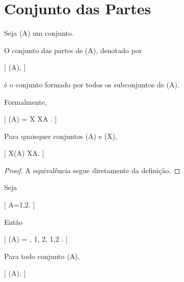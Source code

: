 \documentclass[../../main]{subfiles}
\begin{document}
\section{Conjunto das Partes}
\label{sec:matematica:teoria-conjuntos:conjunto-das-partes}

\begin{defn}
	\label{def:matematica:teoria-conjuntos:conjunto-das-partes:conjunto-das-partes}

	Seja (A) um conjunto.

	O conjunto das partes de (A), denotado por

		[
			(A),
		]

	é o conjunto formado por todos os subconjuntos de (A).

	Formalmente,

	[
			(A)
				=
				{
					X
					\mid
					X\subseteq A
				}.
		]

\end{defn}

\begin{prop}
	\label{prop:matematica:teoria-conjuntos:conjunto-das-partes:caracterizacao}

	Para quaisquer conjuntos (A) e (X),

	[
			X\in{}(A)
			\Leftrightarrow
			X\subseteq A.
		]

\end{prop}

\begin{proof}

	A equivalência segue diretamente da definição.

\end{proof}

\begin{ex}

	Seja

	[
	A={1,2}.
	]

	Então

	[
	(A)
		=
		{
			\varnothing,
			{1},
			{2},
			{1,2}
		}.
	]

\end{ex}

\begin{prop}
	\label{prop:matematica:teoria-conjuntos:conjunto-das-partes:vazio}

	Para todo conjunto (A),

	[
			\varnothing
			\in
			(A).
		]

\end{prop}
\end{document}
